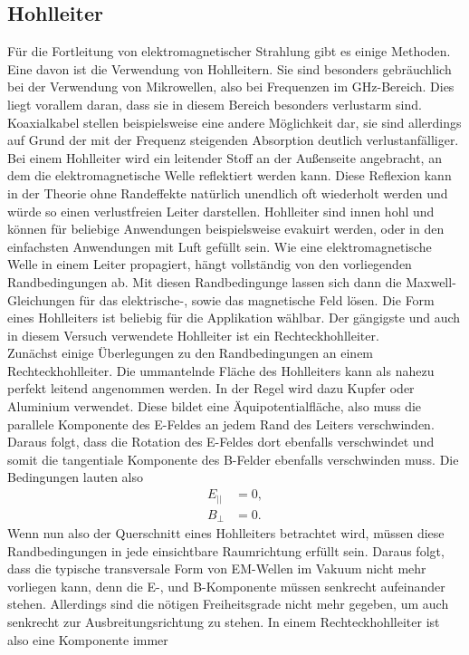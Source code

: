 \subsection{Hohlleiter}
Für die Fortleitung von elektromagnetischer Strahlung gibt es einige Methoden. Eine davon ist die Verwendung von Hohlleitern. Sie sind besonders gebräuchlich bei der Verwendung von Mikrowellen, also bei Frequenzen im $\si{\giga\hertz}$-Bereich.
Dies liegt vorallem daran, dass sie in diesem Bereich besonders verlustarm sind. Koaxialkabel stellen beispielsweise eine andere Möglichkeit dar, sie sind allerdings auf Grund der mit der Frequenz steigenden Absorption deutlich 
verlustanfälliger. Bei einem Hohlleiter wird ein leitender Stoff an der Außenseite angebracht, an dem die elektromagnetische Welle reflektiert werden kann. Diese Reflexion kann in der Theorie ohne Randeffekte natürlich unendlich oft
wiederholt werden und würde so einen verlustfreien Leiter darstellen. Hohlleiter sind innen hohl und können für beliebige Anwendungen beispielsweise evakuirt werden, oder
in den einfachsten Anwendungen mit Luft gefüllt sein.
Wie eine elektromagnetische Welle in einem Leiter propagiert, hängt vollständig von den vorliegenden Randbedingungen ab. Mit diesen Randbedingunge lassen sich dann die Maxwell-Gleichungen für das elektrische-, sowie das magnetische Feld lösen.
Die Form eines Hohlleiters ist beliebig für die Applikation wählbar. Der gängigste und auch in diesem Versuch verwendete Hohlleiter ist ein Rechteckhohlleiter. 
\\
\newline
Zunächst einige Überlegungen zu den Randbedingungen an einem Rechteckhohlleiter. Die ummantelnde Fläche des Hohlleiters kann als nahezu perfekt leitend angenommen werden. In der Regel wird dazu Kupfer oder Aluminium verwendet. Diese bildet eine 
Äquipotentialfläche, also muss die parallele Komponente des E-Feldes an jedem Rand des Leiters verschwinden. Daraus folgt, dass die Rotation des E-Feldes dort ebenfalls verschwindet und somit die tangentiale Komponente des B-Felder ebenfalls
verschwinden muss. Die Bedingungen lauten also
\begin{align*}
E_{||} &= 0, \\
B_{⊥} &= 0.
\end{align*}
Wenn nun also der Querschnitt eines Hohlleiters betrachtet wird, müssen diese Randbedingungen in jede einsichtbare Raumrichtung erfüllt sein. Daraus folgt, dass die typische transversale Form von EM-Wellen im Vakuum nicht mehr vorliegen kann, denn
die E-, und B-Komponente müssen senkrecht aufeinander stehen. Allerdings sind die nötigen Freiheitsgrade nicht mehr gegeben, um auch senkrecht zur Ausbreitungsrichtung zu stehen. In einem Rechteckhohlleiter ist also eine Komponente immer
